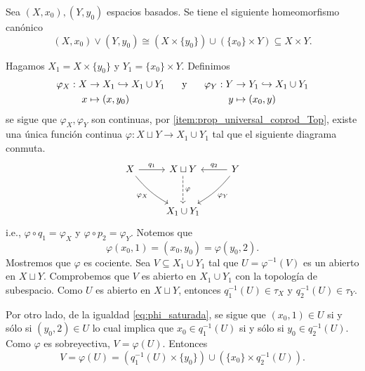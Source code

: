 \begin{lema}
    Sea $(X,x_0),(Y,y_0)$ espacios basados. Se tiene el siguiente homeomorfismo canónico
    \[
    (X,x_0)\vee(Y,y_0)\cong (X\times \{y_0\})\cup (\{x_0\}\times Y)\subseteq X\times Y.
    \]
\end{lema}
\begin{dem}
    Hagamos $X_1=X\times\{y_0\}$ y $Y_1=\{x_0\}\times Y$.  Definimos 
    \begin{equation*}
    \begin{split}
        \varphi_X:X&\to X_1\hookrightarrow X_1\cup Y_1\text{\hspace{0.5cm} y \hspace{0.5cm}}\\ 
                  x&\mapsto (x,y_0)
    \end{split}
    \begin{split}
        \varphi_Y:Y&\to Y_1\hookrightarrow X_1\cup Y_1\\ 
                  y&\mapsto (x_0,y)
    \end{split}
    \end{equation*}
    se sigue que $\varphi_X, \varphi_Y$ son continuas, por \ref{item:prop_universal_coprod_Top}, existe una única función continua $\varphi:X\sqcup Y\to X_1\cup Y_1$ tal que el siguiente diagrama conmuta. 
    \begin{equation*}
        \begin{tikzcd}[row sep = 1cm]
            X\arrow[r,"q_1"]\arrow[rd, bend right=10, "\varphi_X"'] & X\sqcup Y \arrow[d, dashed, "\varphi"] & Y \arrow[l, "q_2"'] \arrow[dl, bend left=10, "\varphi_Y"] \\
                             & X_1\cup Y_1 & 
        \end{tikzcd}
    \end{equation*}
    i.e., $\varphi\circ q_1=\varphi_X$ y $\varphi\circ p_2=\varphi_Y$. Notemos que 
    \begin{equation}
        \label{eq:phi_saturada}
        \varphi(x_0,1)=(x_0,y_0)=\varphi(y_0,2).
    \end{equation}
    Mostremos que $\varphi$ es cociente. Sea $V \subseteq X_1 \cup Y_1$ tal que $U = \varphi^{-1}(V)$ es un abierto en $X \sqcup Y$. Comprobemos que $V$ es abierto en $X_1 \cup Y_1$ con la topología de subespacio. Como $U$ es abierto en $X\sqcup Y$, entonces $q_1^{-1}(U)\in\tau_X$ y $q_2^{-1}(U)\in\tau_Y$.

    Por otro lado, de la igualdad \ref{eq:phi_saturada}, se sigue que $(x_0,1)\in U$ si y sólo si $(y_0,2)\in U$
    lo cual implica que $x_0\in q_1^{-1}(U)$ si y sólo si $y_0\in q_2^{-1}(U)$. Como $\varphi$ es sobreyectiva, $V = \varphi(U)$. Entonces
    \[
    V=\varphi(U) = (q_1^{-1}(U)\times \{y_0\}) \cup (\{x_0\}\times q_2^{-1}(U)).
    \]


\end{dem}
